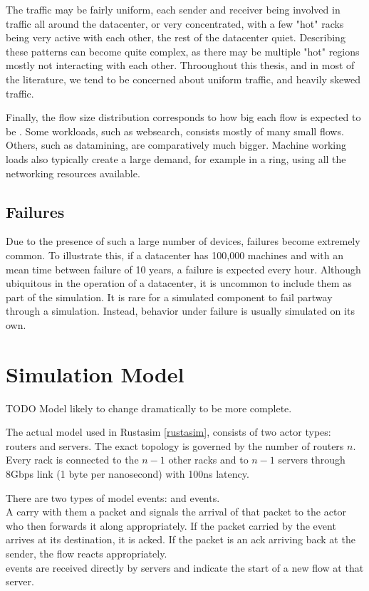 The traffic may be fairly uniform, each sender and receiver being involved in traffic all around the datacenter, or very concentrated, with a few "hot" racks being very active with each other, the rest of the datacenter quiet.
Describing these patterns can become quite complex, as there may be multiple "hot" regions mostly not interacting with each other.
Throoughout this thesis, and in most of the literature, we tend to be concerned about uniform traffic, and heavily skewed traffic. %

Finally, the flow size distribution corresponds to how big each flow is expected to be \cite{alizadeh_data_2010}.
Some workloads, such as websearch, consists mostly of many small flows.
Others, such as datamining, are comparatively much bigger.
Machine working loads also typically create a large demand, for example in a ring, using all the networking resources available.

\subsection{Failures} \label{failures} %

Due to the presence of such a large number of devices, failures become extremely common. %
To illustrate this, if a datacenter has 100,000 machines and with an mean time between failure of 10 years, a failure is expected every hour.
Although ubiquitous in the operation of a datacenter, it is uncommon to include them as part of the simulation.
It is rare for a simulated component to fail partway through a simulation.
Instead, behavior under failure is usually simulated on its own.


\section{Simulation Model} \label{model-sim}

TODO Model likely to change dramatically to be more complete.

The actual model used in Rustasim \ref{rustasim}, consists of two actor types: routers and servers.
The exact topology is governed by the number of routers $n$.
Every rack is connected to the $n-1$ other racks and to $n-1$ servers through 8Gbps link (1 byte per nanosecond) with 100ns latency.

There are two types of model events:  and  events.\\
A  carry with them a packet and signals the arrival of that packet to the actor who then forwards it along appropriately.
If the packet carried by the event arrives at its destination, it is acked.
If the packet is an ack arriving back at the sender, the flow reacts appropriately.\\
 events are received directly by servers and indicate the start of a new flow at that server.

